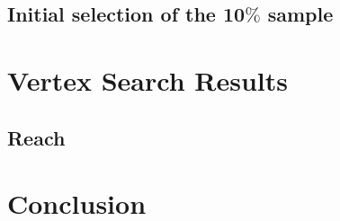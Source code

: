\documentclass[12pt]{report}
\begin{document}
\section{Initial selection of the 10$\%$ sample}


\chapter{Vertex Search Results} 


\section{Reach}


\chapter{Conclusion}




{}

  
                                              

\end{document}
